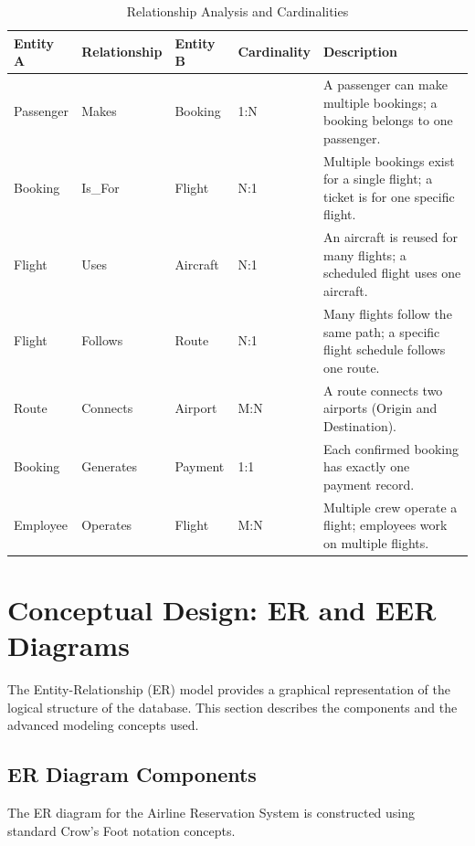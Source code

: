 \documentclass[12pt, a4paper]{article}
\begin{document}
	\begin{table}[H]
		\centering
		\renewcommand{\arraystretch}{1.5}
		\begin{tabular}{|l|p{3cm}|l|l|p{4cm}|}
			\hline
			\textbf{Entity A} & \textbf{Relationship} & \textbf{Entity B} & \textbf{Cardinality} & \textbf{Description} \\
			\hline
			Passenger & Makes & Booking & 1:N & A passenger can make multiple bookings; a booking belongs to one passenger. \\
			\hline
			Booking & Is\_For & Flight & N:1 & Multiple bookings exist for a single flight; a ticket is for one specific flight. \\
			\hline
			Flight & Uses & Aircraft & N:1 & An aircraft is reused for many flights; a scheduled flight uses one aircraft. \\
			\hline
			Flight & Follows & Route & N:1 & Many flights follow the same path; a specific flight schedule follows one route. \\
			\hline
			Route & Connects & Airport & M:N & A route connects two airports (Origin and Destination). \\
			\hline
			Booking & Generates & Payment & 1:1 & Each confirmed booking has exactly one payment record. \\
			\hline
			Employee & Operates & Flight & M:N & Multiple crew operate a flight; employees work on multiple flights. \\
			\hline
		\end{tabular}
		\caption{Relationship Analysis and Cardinalities}
		\label{tab:relationship_matrix}
	\end{table}
	
	\newpage
	\section{Conceptual Design: ER and EER Diagrams}
	
	The Entity-Relationship (ER) model provides a graphical representation of the logical structure of the database. This section describes the components and the advanced modeling concepts used.
	
	\subsection{ER Diagram Components}
	
	The ER diagram for the Airline Reservation System is constructed using standard Crow's Foot notation concepts.
	
\end{document}
